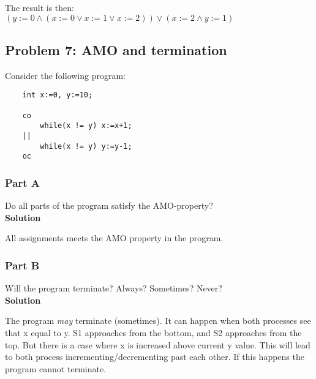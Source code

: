 The result is then: \\
$ (y:=0 \land (x:=0 \lor x:=1 \lor x:=2)) \lor (x:=2 \land y:=1)$


\subsection{Problem 7: AMO and termination}

Consider the following program:

\begin{lstlisting}
    int x:=0, y:=10;

    co 
        while(x != y) x:=x+1;
    ||
        while(x != y) y:=y-1;
    oc
\end{lstlisting}

\subsubsection{Part A}

Do all parts of the program satisfy the AMO-property? \\

\textbf{Solution}

All assignments meets the AMO property in the program. 



\subsubsection{Part B}

Will the program terminate? Always? Sometimes? Never? \\

\textbf{Solution}

The program \textit{may} terminate (sometimes). It can happen when both processes see that x equal to y. 
S1 approaches from the bottom, and S2 approaches from the top. But there is a case where x is increased above current y value.
This will lead to both process incrementing/decrementing past each other. If this happens the program cannot terminate.  